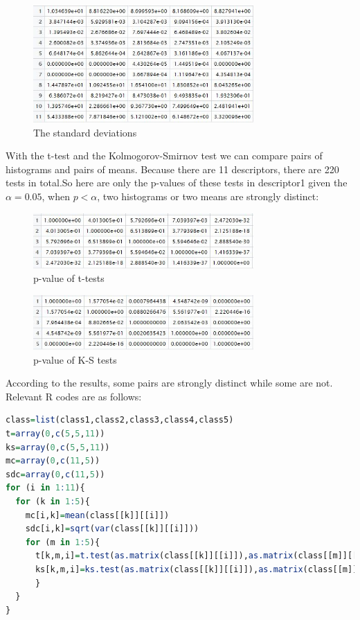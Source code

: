 \documentclass{article}
\begin{document}
  \begin{figure}[H]
  \centering
  \includegraphics[width=0.75\textwidth]{sdc.jpg}
  \caption{The standard deviations}\label{}
  \end{figure}
With the t-test and the Kolmogorov-Smirnov test we can compare pairs of histograms and pairs of means. Because there are 11 descriptors, there are 220 tests in total.So here are only the p-values of these tests in descriptor1 given the $\alpha=0.05$, when $p<\alpha$, two histograms or two means are strongly distinct:
  \begin{figure}[H]
  \centering
  \includegraphics[width=0.75\textwidth]{t1.jpg}
  \caption{p-value of t-tests}\label{}
  \end{figure}
  \begin{figure}[H]
  \centering
  \includegraphics[width=0.75\textwidth]{ks1.jpg}
  \caption{p-value of K-S tests}\label{}
  \end{figure}
According to the results, some pairs are strongly distinct while some are not.\\
Relevant R codes are as follows:
\begin{lstlisting}[language=R]
class=list(class1,class2,class3,class4,class5)
t=array(0,c(5,5,11))
ks=array(0,c(5,5,11))
mc=array(0,c(11,5))
sdc=array(0,c(11,5))
for (i in 1:11){
  for (k in 1:5){
    mc[i,k]=mean(class[[k]][[i]])
    sdc[i,k]=sqrt(var(class[[k]][[i]]))
    for (m in 1:5){
      t[k,m,i]=t.test(as.matrix(class[[k]][[i]]),as.matrix(class[[m]][[i]]))$p.value
      ks[k,m,i]=ks.test(as.matrix(class[[k]][[i]]),as.matrix(class[[m]][[i]]))$p.value
      }
  }
}
\end{lstlisting}
\end{document}
